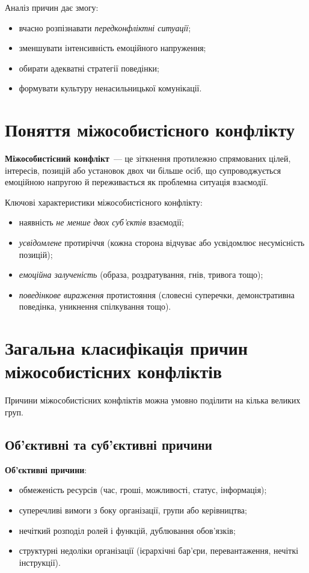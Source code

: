 \documentclass[12pt,a4paper]{article}
\begin{document}
    Аналіз причин дає змогу:
    \begin{itemize}
        \item вчасно розпізнавати \textit{передконфліктні ситуації};
        \item зменшувати інтенсивність емоційного напруження;
        \item обирати адекватні стратегії поведінки;
        \item формувати культуру ненасильницької комунікації.
    \end{itemize}

    \section*{Поняття міжособистісного конфлікту}
    \textbf{Міжособистісний конфлікт}~--- це зіткнення протилежно спрямованих цілей, інтересів, позицій або установок двох чи більше осіб, 
    що супроводжується емоційною напругою й переживається як проблемна ситуація взаємодії.

    Ключові характеристики міжособистісного конфлікту:
    \begin{itemize}
        \item наявність \textit{не менше двох суб’єктів} взаємодії;
        \item \textit{усвідомлене} протиріччя (кожна сторона відчуває або усвідомлює несумісність позицій);
        \item \textit{емоційна залученість} (образа, роздратування, гнів, тривога тощо);
        \item \textit{поведінкове вираження} протистояння (словесні суперечки, демонстративна поведінка, уникнення спілкування тощо).
    \end{itemize}

    \section*{Загальна класифікація причин міжособистісних конфліктів}
    Причини міжособистісних конфліктів можна умовно поділити на кілька великих груп.

    \subsection*{Об’єктивні та суб’єктивні причини}
    \textbf{Об’єктивні причини}:
    \begin{itemize}
        \item обмеженість ресурсів (час, гроші, можливості, статус, інформація);
        \item суперечливі вимоги з боку організації, групи або керівництва;
        \item нечіткий розподіл ролей і функцій, дублювання обов’язків;
        \item структурні недоліки організації (ієрархічні бар’єри, перевантаження, нечіткі інструкції).
    \end{itemize}
\end{document}
